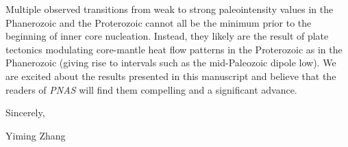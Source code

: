 \documentclass[11pt, letterpaper]{article}
\begin{document}
\begin{flushleft}
Multiple observed transitions from weak to strong paleointensity values in the Phanerozoic and the Proterozoic cannot all be the minimum prior to the beginning of inner core nucleation. Instead, they likely are the result of plate tectonics modulating core-mantle heat flow patterns in the Proterozoic as in the Phanerozoic (giving rise to intervals such as the mid-Paleozoic dipole low). We are excited about the results presented in this manuscript and believe that the readers of \textit{PNAS} will find them compelling and a significant advance.

Sincerely,

Yiming Zhang\\




 
 
% 






\end{flushleft}
\end{document}
